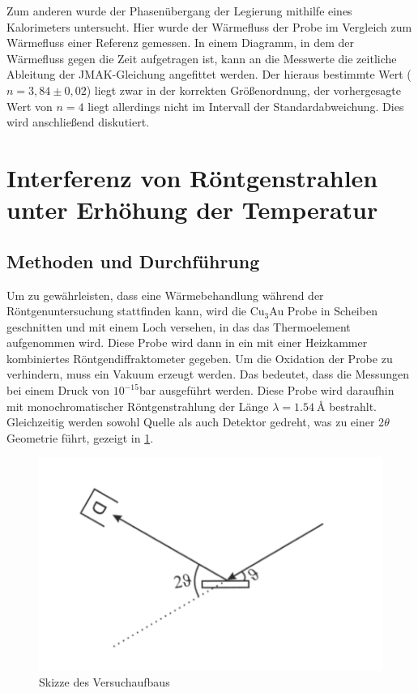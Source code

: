 \documentclass[
	a4paper,
	12pt,
	pagesize,
	ngerman
]{scrartcl}
\begin{document}
Zum anderen wurde der Phasenübergang der Legierung mithilfe eines Kalorimeters untersucht. Hier wurde der Wärmefluss der Probe im Vergleich zum Wärmefluss einer Referenz gemessen. In einem Diagramm, in dem der Wärmefluss gegen die Zeit aufgetragen ist, kann an die Messwerte die zeitliche Ableitung der JMAK-Gleichung angefittet werden. Der hieraus bestimmte Wert ($n=3,84\pm0,02$) liegt zwar in der korrekten Größenordnung, der vorhergesagte Wert von $n=4$ liegt allerdings nicht im Intervall der Standardabweichung. Dies wird anschließend diskutiert.


\section{Interferenz von Röntgenstrahlen unter Erhöhung der Temperatur}
\subsection{Methoden und Durchführung}
Um zu gewährleisten, dass eine Wärmebehandlung während der Röntgenuntersuchung stattfinden kann, wird die Cu$_{3}$Au Probe in Scheiben geschnitten und mit einem Loch versehen, in das das Thermoelement aufgenommen wird. Diese Probe wird dann in ein mit einer Heizkammer kombiniertes Röntgendiffraktometer gegeben. Um die Oxidation der Probe zu verhindern, muss ein Vakuum erzeugt werden. Das bedeutet, dass die Messungen bei einem Druck von $10^{-15}$bar ausgeführt werden. Diese Probe wird daraufhin mit monochromatischer Röntgenstrahlung der Länge $\lambda = \SI{1,54}{\angstrom}$ bestrahlt. Gleichzeitig werden sowohl Quelle als auch Detektor gedreht, was zu einer 2$\theta$ Geometrie führt, gezeigt in \cref{theta}.

\begin{figure}[h]
	\centering
	\includegraphics[scale=0.3]{2theta.PNG}
	\caption{Skizze des Versuchaufbaus}
	\label{theta}
\end{figure}
\end{document}
